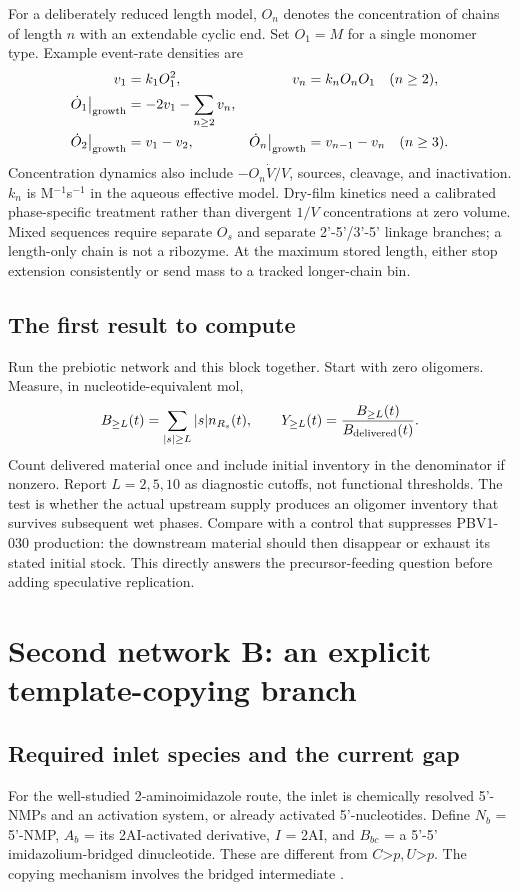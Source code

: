 \documentclass[11pt]{article}
\newcommand{\cp}{\mathord{>}p}
\begin{document}
For a deliberately reduced length model, $O_n$ denotes the concentration of
chains of length $n$ with an extendable cyclic end. Set $O_1=M$ for a single
monomer type. Example event-rate densities are
\begin{align}
v_1&=k_1O_1^2,&v_n&=k_nO_nO_1\quad(n\ge2),\\
\dot O_1\big|_{\rm growth}&=-2v_1-\sum_{n\ge2}v_n,\\
\dot O_2\big|_{\rm growth}&=v_1-v_2, &
\dot O_n\big|_{\rm growth}&=v_{n-1}-v_n\quad(n\ge3).
\end{align}
Concentration dynamics also include $-O_n\dot V/V$, sources, cleavage, and
inactivation. $k_n$ is M$^{-1}$s$^{-1}$ in the aqueous effective model. Dry-film
kinetics need a calibrated phase-specific treatment rather than divergent
$1/V$ concentrations at zero volume. Mixed sequences require separate $O_s$
and separate 2'-5'/3'-5' linkage branches; a length-only chain is not a ribozyme.
At the maximum stored length, either stop extension consistently or send mass
to a tracked longer-chain bin.

\subsection{The first result to compute}
Run the prebiotic network and this block together. Start with zero oligomers.
Measure, in nucleotide-equivalent mol,
\begin{equation}
B_{\ge L}(t)=\sum_{|s|\ge L}|s|n_{R_s}(t),\qquad
Y_{\ge L}(t)=\frac{B_{\ge L}(t)}{B_{\rm delivered}(t)}.
\end{equation}
Count delivered material once and include initial inventory in the denominator
if nonzero. Report $L=2,5,10$ as diagnostic cutoffs, not functional thresholds.
The test is whether the actual upstream supply produces an oligomer inventory
that survives subsequent wet phases. Compare with a control that suppresses
PBV1-030 production: the downstream material should then disappear or exhaust
its stated initial stock. This directly answers the precursor-feeding question
before adding speculative replication.

\section{Second network B: an explicit template-copying branch}
\subsection{Required inlet species and the current gap}
For the well-studied 2-aminoimidazole route, the inlet is chemically resolved
5'-NMPs and an activation system, or already activated 5'-nucleotides. Define
$N_b$ = 5'-NMP, $A_b$ = its 2AI-activated derivative, $I$ = 2AI, and
$B_{bc}$ = a 5'-5' imidazolium-bridged dinucleotide. These are different from
$C\cp,U\cp$. The copying mechanism involves the bridged intermediate
\cite{walton,activation}.
\end{document}
